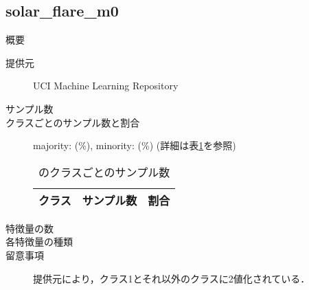\subsection{solar\_flare\_m0}
\begin{description}
    \item[概要] \cite{}
    \item[提供元] UCI Machine Learning Repository
    \item[サンプル数] 
    \item[クラスごとのサンプル数と割合] majority:  (\%), minority:  (\%) (詳細は表\ref{tab:}を参照)

        \begin{table}[htbp]
            \centering
            \caption{のクラスごとのサンプル数}
            \label{tab:}
            \begin{tabular}{lrc} \hline
                \multicolumn{1}{c}{クラス}&
                \multicolumn{1}{c}{サンプル数}&
                \multicolumn{1}{c}{割合}\\
                \hline
                \hline

                \hline
            \end{tabular}
        \end{table}

    \item[特徴量の数] 
    \item[各特徴量の種類] \mbox{}
        
    \item[留意事項] 提供元により，クラス1とそれ以外のクラスに2値化されている．
\end{description}

